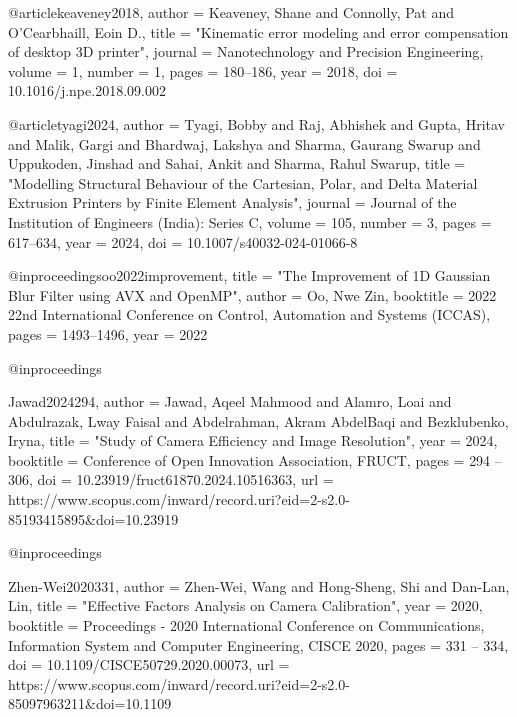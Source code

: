 {@article{keaveney2018,
	author    = {Keaveney, Shane and Connolly, Pat and O'Cearbhaill, Eoin D.},
	title     = "{Kinematic error modeling and error compensation of desktop 3D printer}",
	journal   = {Nanotechnology and Precision Engineering},
	volume    = {1},
	number    = {1},
	pages     = {180--186},
	year      = {2018},
	doi       = {10.1016/j.npe.2018.09.002}
}

@article{tyagi2024,
	author    = {Tyagi, Bobby and Raj, Abhishek and Gupta, Hritav and Malik, Gargi and Bhardwaj, Lakshya and Sharma, Gaurang Swarup and Uppukoden, Jinshad and Sahai, Ankit and Sharma, Rahul Swarup},
	title     = "{Modelling Structural Behaviour of the Cartesian, Polar, and Delta Material Extrusion Printers by Finite Element Analysis}",
	journal   = {Journal of the Institution of Engineers (India): Series C},
	volume    = {105},
	number    = {3},
	pages     = {617--634},
	year      = {2024},
	doi       = {10.1007/s40032-024-01066-8}
}

@inproceedings{oo2022improvement,
	title        = "{The Improvement of 1D Gaussian Blur Filter using AVX and OpenMP}",
	author       = {Oo, Nwe Zin},
	booktitle    = {2022 22nd International Conference on Control, Automation and Systems (ICCAS)},
	pages        = {1493--1496},
	year         = {2022}
}

@inproceedings{Jawad2024294,
	author       = {Jawad, Aqeel Mahmood and Alamro, Loai and Abdulrazak, Lway Faisal and Abdelrahman, Akram AbdelBaqi and Bezklubenko, Iryna},
	title        = "{Study of Camera Efficiency and Image Resolution}",
	year         = {2024},
	booktitle    = {Conference of Open Innovation Association, FRUCT},
	pages        = {294 – 306},
	doi          = {10.23919/fruct61870.2024.10516363},
	url          = {https://www.scopus.com/inward/record.uri?eid=2-s2.0-85193415895&doi=10.23919%
}

@inproceedings{Zhen-Wei2020331,
	author       = {Zhen-Wei, Wang and Hong-Sheng, Shi and Dan-Lan, Lin},
	title        = "{Effective Factors Analysis on Camera Calibration}",
	year         = {2020},
	booktitle    = {Proceedings - 2020 International Conference on Communications, Information System and Computer Engineering, CISCE 2020},
	pages        = {331 – 334},
	doi          = {10.1109/CISCE50729.2020.00073},
	url          = {https://www.scopus.com/inward/record.uri?eid=2-s2.0-85097963211&doi=10.1109%
}

}}}
